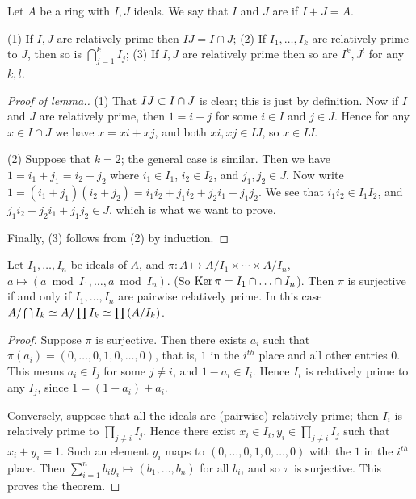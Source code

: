 \begin{dfn}
Let $A$ be a ring with $I, J$ ideals.
We say that $I$ and $J$ are  if $I + J = A$.
\end{dfn}
\begin{lem}
(1) If $I, J$ are relatively prime then $IJ = I \cap J$;
(2) If $I_1, \dotsc, I_k$ are relatively prime to $J$, then so is $\bigcap_{j = 1}^k I_j$;
(3) If $I, J$ are relatively prime then so are $I^k, J^l$ for any $k, l$.
\end{lem}
\begin{proof}[Proof of lemma.]
(1) That $IJ \subset I \cap J$ is clear; this is just by definition.
Now if $I$ and $J$ are relatively prime, then $1 = i + j$ for some $i \in I$ and $j \in J$.
Hence for any $x \in I \cap J$ we have $x = xi + xj$, and both $xi, xj \in IJ$, so $x \in IJ$.

(2) Suppose that $k = 2$; the general case is similar.
Then we have $1 = i_1 + j_1 = i_2 + j_2$ where $i_1 \in I_1$, $i_2 \in I_2$, and $j_1, j_2 \in J$.
Now write $1 = (i_1 + j_1)(i_2 + j_2) = i_1 i_2 + j_1 i_2 + j_2 i_1 + j_1 j_2$.
We see that $i_1 i_2 \in I_1 I_2$, and $j_1 i_2 + j_2 i_1 + j_1 j_2 \in J$, which is what we want to prove.

Finally, (3) follows from (2) by induction.
\end{proof}
\begin{thm}
Let $I_1, \dotsc, I_n$ be ideals of $A$, and $\pi: A \mapsto A / I_1 \times \dotsb \times A / I_n$, $a \mapsto (a \bmod I_1, \dotsc, a \bmod I_n)$.
(So $\operatorname{Ker}{\pi} = I_1 \cap \dotsc \cap I_n$). 
Then $\pi$ is surjective if and only if $I_1, \dotsc, I_n$ are pairwise relatively prime.
In this case $A / \bigcap I_k \simeq A / \prod I_k \simeq \prod \left(A / I_k\right)$.
\end{thm}
\begin{proof}
Suppose $\pi$ is surjective.
Then there exists $a_i$ such that $\pi(a_i) = (0, \dotsc, 0, 1, 0, \dots, 0)$, that is, $1$ in the $i^{th}$ place and all other entries $0$.
This means $a_i \in I_j$ for some $j \neq i$, and $1 - a_i \in I_i$.
Hence $I_i$ is relatively prime to any $I_j$, since $1 = (1 - a_i) + a_i$.

Conversely, suppose that all the ideals are (pairwise) relatively prime; then $I_i$ is relatively prime to $\prod_{j \neq i} I_j$.
Hence there exist $x_i \in I_i, y_i \in \prod_{j \neq i} I_j$ such that $x_i + y_i = 1$.
Such an element $y_i$ maps to $(0, \dotsc, 0, 1, 0, \dotsc, 0)$ with the $1$ in the $i^{th}$ place.
Then $\sum_{i = 1}^{n} b_i y_i \mapsto (b_1, \dotsc, b_n)$ for all $b_i$, and so $\pi$ is surjective.
This proves the theorem.
\end{proof}

